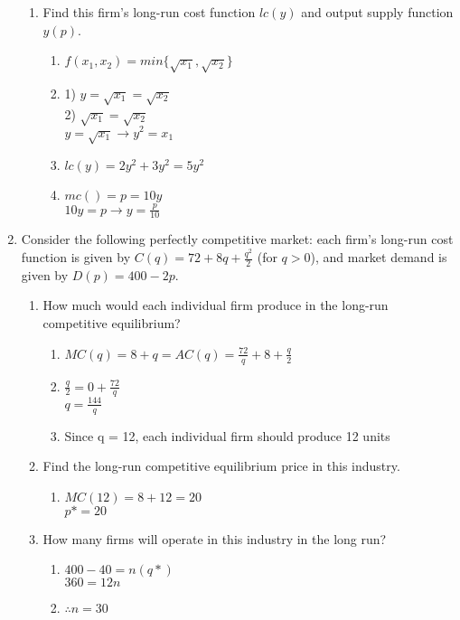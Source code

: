 \documentclass[11pt]{article}
\begin{document}
\begin{enumerate}
\begin{enumerate}
        \item Find this firm's long-run cost function $lc(y)$ and output supply function $y(p)$.
        \begin{enumerate}
            \item $f(x_1, x_2) = min\{\sqrt{x_1}, \sqrt{x_2}\}$
            \item 1) $y = \sqrt{x_1} = \sqrt{x_2}$\\
            2) $\sqrt{x_1} = \sqrt{x_2}$\\
            $y = \sqrt{x_1} \rightarrow y^2 = x_1$
            \item $lc(y) = 2y^2 + 3y^2 = 5y^2$
            \item $mc() = p = 10y$\\
            $10y = p \rightarrow y = \frac{p}{10}$
        \end{enumerate}

    \end{enumerate}
    
\pagebreak
\item Consider the following perfectly competitive market: each firm's long-run cost function is given by $C(q)=72+8q+\frac{q^{2}}{2}$ (for $q>0$), and market demand is given by $D(p)=400-2p$.
    \begin{enumerate}
    \item How much would each individual firm produce in the long-run competitive equilibrium?
    \begin{enumerate}
        \item $MC(q) = 8 + q = AC(q) = \frac{72}{q} + 8 + \frac{q}{2}$
        \item $\frac{q}{2} = 0 + \frac{72}{q}$\\
        $q = \frac{144}{q}$
        \item Since q = 12, each individual firm should produce 12 units
    \end{enumerate}

    \item Find the long-run competitive equilibrium price in this industry.
    \begin{enumerate}
        \item $MC(12) = 8 + 12 = 20$\\
        $p* = 20$
    \end{enumerate}

    \item How many firms will operate in this industry in the long run?
    \begin{enumerate}
        \item $400 - 40 = n(q*)$\\
        $360 = 12n$
        \item $\therefore n = 30$
    \end{enumerate}

    \end{enumerate}

\end{enumerate}
\end{document}
